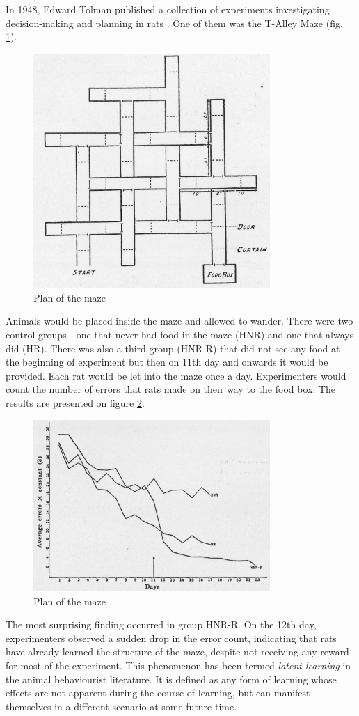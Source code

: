 \documentclass[12pt]{article}
\begin{document}
In 1948, Edward Tolman published a collection of experiments investigating decision-making and planning in rats \cite{cog_maps_tolman}. One of them was the T-Alley Maze (fig. \ref{fig:tolman_maze}).
\begin{figure}[!htbp]
	\centering
	\includegraphics[width=9cm]{tolman_maze}
	\caption{Plan of the maze}
	\label{fig:tolman_maze}
\end{figure}
Animals would be placed inside the maze and allowed to wander. There were two control groups - one that never had food in the maze (HNR) and one that always did (HR). There was also a third group (HNR-R) that did not see any food at the beginning of experiment but then on 11th day and onwards it would be provided. Each rat would be let into the maze once a day. Experimenters would count the number of errors that rats made on their way to the food box. The results are presented on figure \ref{fig:tolman_maze_results}.
\begin{figure}[!htbp]
	\centering
	\includegraphics[width=9cm]{tolman_maze_results}
	\caption{Plan of the maze}
	\label{fig:tolman_maze_results}
\end{figure}
The most surprising finding occurred in group HNR-R. On the 12th day, experimenters observed a sudden drop in the error count, indicating that rats have already learned the structure of the maze, despite not receiving any reward for most of the experiment. This phenomenon has been termed \textit{latent learning} in the animal behaviourist literature. It is defined as any form of learning whose effects are not apparent during the course of learning, but can manifest themselves in a different scenario at some future time.
\end{document}
